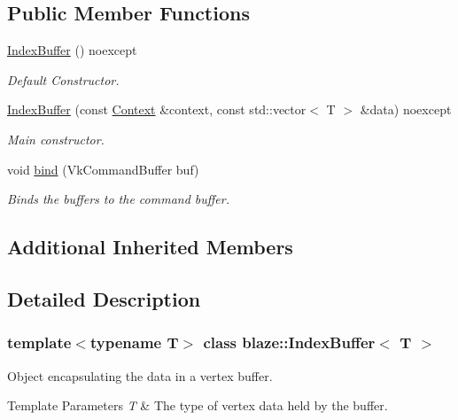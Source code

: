 \subsection*{Public Member Functions}
\begin{DoxyCompactItemize}
\item 
\mbox{\label{classblaze_1_1IndexBuffer_ae31bddb3488eb4020ee6e7b5bd2cb09f}} 
\hyperlink{classblaze_1_1IndexBuffer_ae31bddb3488eb4020ee6e7b5bd2cb09f}{Index\+Buffer} () noexcept
\begin{DoxyCompactList}\small\item\em Default Constructor. \end{DoxyCompactList}\item 
\hyperlink{classblaze_1_1IndexBuffer_a3b0b5603a54fb59d24fb2e46afe2d19b}{Index\+Buffer} (const \hyperlink{classblaze_1_1Context}{Context} \&context, const std\+::vector$<$ T $>$ \&data) noexcept
\begin{DoxyCompactList}\small\item\em Main constructor. \end{DoxyCompactList}\item 
void \hyperlink{classblaze_1_1IndexBuffer_a51ce12bd53a32ca6e6dabb37a623a922}{bind} (Vk\+Command\+Buffer buf)
\begin{DoxyCompactList}\small\item\em Binds the buffers to the command buffer. \end{DoxyCompactList}\end{DoxyCompactItemize}
\subsection*{Additional Inherited Members}


\subsection{Detailed Description}
\subsubsection*{template$<$typename T$>$\newline
class blaze\+::\+Index\+Buffer$<$ T $>$}

Object encapsulating the data in a vertex buffer. 


\begin{DoxyTemplParams}{Template Parameters}
{\em T} & The type of vertex data held by the buffer. \\
\hline
\end{DoxyTemplParams}


